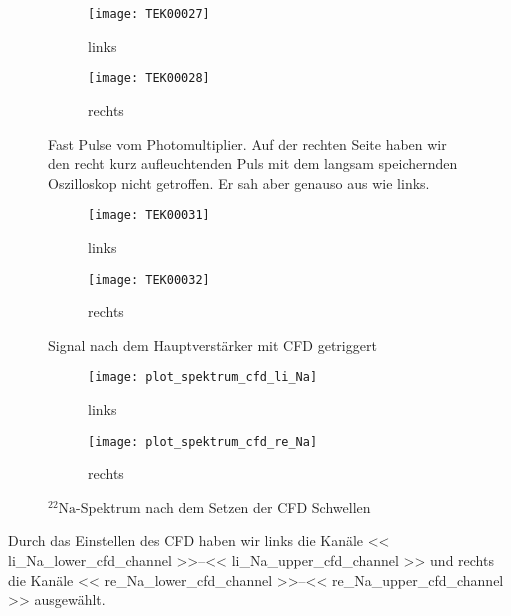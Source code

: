 \documentclass[11pt, ngerman, fleqn, DIV=15, headinclude, BCOR=2cm]{scrreprt}
\begin{document}
\begin{figure}
	\centering
	\begin{subfigure}{0.49 \textwidth}
		\texttt{[image: TEK00027]}
		\caption{%
			links
		}
		\label{fig:fast_signal-li}
	\end{subfigure}
	\begin{subfigure}{0.49 \textwidth}
		\texttt{[image: TEK00028]}
		\caption{%
			rechts
		}
		\label{fig:fast_signal-re}
	\end{subfigure}
	\caption{%
		Fast Pulse vom Photomultiplier. Auf der rechten Seite haben wir
		den recht kurz aufleuchtenden Puls mit dem langsam speichernden
		Oszilloskop nicht getroffen. Er sah aber genauso aus wie links.
	}
	\label{fig:fast_signal}
\end{figure}

\begin{figure}
	\centering
	\begin{subfigure}{0.49 \textwidth}
		\texttt{[image: TEK00031]}
		\caption{%
			links
		}
		\label{fig:fast_signal_cfd_trig-li}
	\end{subfigure}
	\begin{subfigure}{0.49 \textwidth}
		\texttt{[image: TEK00032]}
		\caption{%
			rechts
		}
		\label{fig:fast_signal_cfd_trig-re}
	\end{subfigure}
	\caption{%
		Signal nach dem Hauptverstärker mit CFD getriggert
	}
	\label{fig:fast_signal_cfd_trig}
\end{figure}

\begin{figure}
	\centering
	\begin{subfigure}{0.49 \textwidth}
		\texttt{[image: plot\_spektrum\_cfd\_li\_Na]}
		\caption{%
			links
		}
		\label{fig:fast_signal_cfd_plot-li}
	\end{subfigure}
	\begin{subfigure}{0.49 \textwidth}
		\texttt{[image: plot\_spektrum\_cfd\_re\_Na]}
		\caption{%
			rechts
		}
		\label{fig:fast_signal_cfd_plot-re}
	\end{subfigure}
	\caption{%
		$^{22}\text{Na}$-Spektrum nach dem Setzen der CFD Schwellen
	}
	\label{fig:fast_signal_cfd_plot}
\end{figure}

Durch das Einstellen des CFD haben wir links die Kanäle
\numrange{<< li_Na_lower_cfd_channel >>}{<< li_Na_upper_cfd_channel >>} und rechts
die Kanäle
\numrange{<< re_Na_lower_cfd_channel >>}{<< re_Na_upper_cfd_channel >>} ausgewählt.
\end{document}
